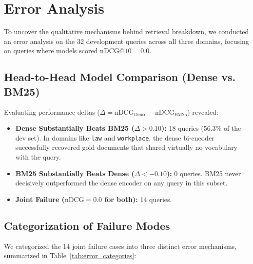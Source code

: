 \section{Error Analysis}
\label{sec:errors}

To uncover the qualitative mechanisms behind retrieval breakdown, we conducted an error analysis on the 32 development queries across all three domains, focusing on queries where models scored $\text{nDCG}@10 = 0.0$.

\subsection{Head-to-Head Model Comparison (Dense vs. BM25)}
Evaluating performance deltas ($\Delta = \text{nDCG}_{\text{Dense}} - \text{nDCG}_{\text{BM25}}$) revealed:
\begin{itemize}
    \item \textbf{Dense Substantially Beats BM25 ($\Delta > 0.10$):} 18 queries (56.3\% of the dev set). In domains like \texttt{law} and \texttt{workplace}, the dense bi-encoder successfully recovered gold documents that shared virtually no vocabulary with the query.
    \item \textbf{BM25 Substantially Beats Dense ($\Delta < -0.10$):} 0 queries. BM25 never decisively outperformed the dense encoder on any query in this subset.
    \item \textbf{Joint Failure ($\text{nDCG} = 0.0$ for both):} 14 queries.
\end{itemize}

\subsection{Categorization of Failure Modes}
We categorized the 14 joint failure cases into three distinct error mechanisms, summarized in Table~\ref{tab:error_categories}:

